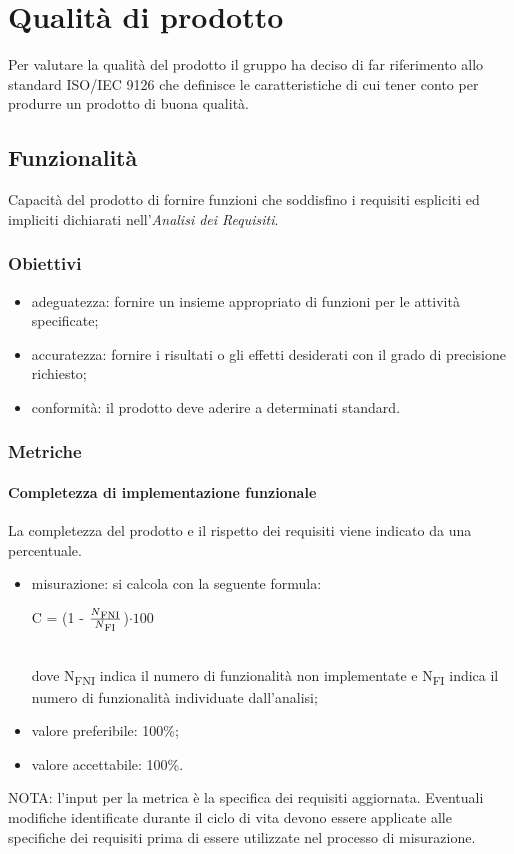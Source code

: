 \section{Qualità di prodotto}
Per valutare la qualità del prodotto il gruppo ha deciso di far riferimento allo standard ISO/IEC 9126 che definisce le caratteristiche di cui tener conto per produrre un prodotto di buona qualità.
	\subsection{Funzionalità}
	Capacità del prodotto di fornire funzioni che soddisfino i requisiti espliciti ed impliciti dichiarati nell'\textit{Analisi dei Requisiti}.
		\subsubsection{Obiettivi}
		\begin{itemize}
			\item adeguatezza: fornire un insieme appropriato di funzioni per le attività specificate;
			\item accuratezza: fornire i risultati o gli effetti desiderati con il grado di precisione richiesto;
			\item conformità: il prodotto deve aderire a determinati standard. %
		\end{itemize}
		\subsubsection{Metriche}
			\paragraph{Completezza di implementazione funzionale}
			La completezza del prodotto e il rispetto dei requisiti viene indicato da una percentuale.
			\begin{itemize}
			\item misurazione: si calcola con la seguente formula: \\
			\centerline { C = (1 - \(\frac{N\textsubscript{FNI}}{N\textsubscript{FI}} \))$ \cdot  100$ } \\
			dove N\textsubscript{FNI} indica il numero di funzionalità non implementate e N\textsubscript{FI} indica il numero di funzionalità individuate dall'analisi;
			\item valore preferibile: 100\%;
			\item valore accettabile: 100\%.
			\end{itemize}
			NOTA: l'input per la metrica è la specifica dei requisiti aggiornata. Eventuali modifiche identificate durante il ciclo di vita devono essere applicate alle specifiche dei requisiti prima di essere utilizzate nel processo di misurazione.
